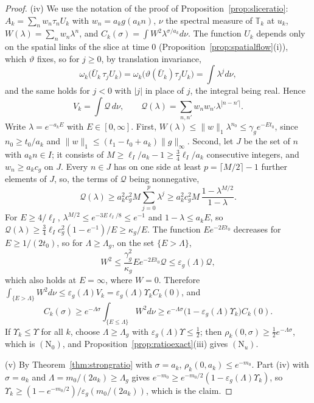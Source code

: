 \documentclass[aps,prd,twocolumn,superscriptaddress,nofootinbib,longbibliography,floatfix,amsmath,amssymb,10pt]{revtex4-2}
\theoremstyle{definition}
\theoremstyle{remark}
\begin{document}
\begin{proof}
(iv) We use the notation of the proof of
Proposition~\ref{prop:sliceratio}: $A_k=\sum_nw_n\tau_nU_k$ with
$w_n=a_kg(a_kn)$, $\nu$ the spectral measure of $\mathbb T_k$ at $u_k$,
$W(\lambda)=\sum_nw_n\lambda^n$, and $C_k(\sigma)=\int W^2\lambda^{\sigma/a_k}
d\nu$. The function $U_k$ depends only on the spatial links of the slice
at time $0$ (Proposition~\ref{prop:spatialflow}(i)), which $\vartheta$
fixes, so for $j\ge0$, by translation invariance,
\[
\omega_k\bigl(\bar U_k\,\tau_jU_k\bigr)=\omega_k\bigl(\vartheta(\bar U_k)
\tau_jU_k\bigr)=\int\lambda^jd\nu ,
\]
and the same holds for $j<0$ with $|j|$ in place of $j$, the integral
being real. Hence
\[
V_k=\int\mathcal Q\,d\nu,\qquad
\mathcal Q(\lambda)=\sum_{n,n'}w_nw_{n'}\lambda^{|n-n'|} .
\]
Write $\lambda=e^{-a_kE}$ with $E\in[0,\infty]$. First,
$W(\lambda)\le\|w\|_1\lambda^{n_0}\le\gamma_ge^{-Et_0}$, since
$n_0\ge t_0/a_k$ and $\|w\|_1\le(t_1-t_0+a_k)\|g\|_\infty$. Second, let
$J$ be the set of $n$ with $a_kn\in I$; it consists of
$M\ge\ell_I/a_k-1\ge\frac34\ell_I/a_k$ consecutive integers, and $w_n\ge
a_kc_g$ on $J$. Every $n\in J$ has on one side at least $p=\lceil
M/2\rceil-1$ further elements of $J$, so, the terms of $\mathcal Q$ being
nonnegative,
\[
\mathcal Q(\lambda)\ge a_k^2c_g^2M\sum_{j=0}^{p}\lambda^j
\ge a_k^2c_g^2M\,\frac{1-\lambda^{M/2}}{1-\lambda} .
\]
For $E\ge4/\ell_I$, $\lambda^{M/2}\le e^{-3E\ell_I/8}\le e^{-1}$ and
$1-\lambda\le a_kE$, so $\mathcal Q(\lambda)\ge\frac34\ell_Ic_g^2
(1-e^{-1})/E\ge\kappa_g/E$. The function $Ee^{-2Et_0}$ decreases for
$E\ge1/(2t_0)$, so for $\Lambda\ge\Lambda_g$, on the set
$\{E>\Lambda\}$,
\[
W^2\le\frac{\gamma_g^2}{\kappa_g}Ee^{-2Et_0}\mathcal Q\le
\varepsilon_g(\Lambda)\mathcal Q ,
\]
which also holds at $E=\infty$, where $W=0$. Therefore
$\int_{\{E>\Lambda\}}W^2d\nu\le\varepsilon_g(\Lambda)V_k=
\varepsilon_g(\Lambda)\Upsilon_kC_k(0)$, and
\[
C_k(\sigma)\ge e^{-\Lambda\sigma}\int_{\{E\le\Lambda\}}W^2d\nu
\ge e^{-\Lambda\sigma}\bigl(1-\varepsilon_g(\Lambda)\Upsilon_k\bigr)C_k(0).
\]
If $\Upsilon_k\le\Upsilon$ for all $k$, choose $\Lambda\ge\Lambda_g$ with
$\varepsilon_g(\Lambda)\Upsilon\le\frac12$; then $\rho_k(0,\sigma)\ge
\frac12e^{-\Lambda\sigma}$, which is $(\mathrm N_0)$, and
Proposition~\ref{prop:ratioexact}(iii) gives $(\mathrm N_u)$.

(v) By Theorem~\ref{thm:strongratio} with $\sigma=a_k$,
$\rho_k(0,a_k)\le e^{-m_0}$. Part (iv) with $\sigma=a_k$ and
$\Lambda=m_0/(2a_k)\ge\Lambda_g$ gives $e^{-m_0}\ge e^{-m_0/2}(1-
\varepsilon_g(\Lambda)\Upsilon_k)$, so $\Upsilon_k\ge(1-e^{-m_0/2})/
\varepsilon_g(m_0/(2a_k))$, which is the claim.


\end{proof}
\end{document}
